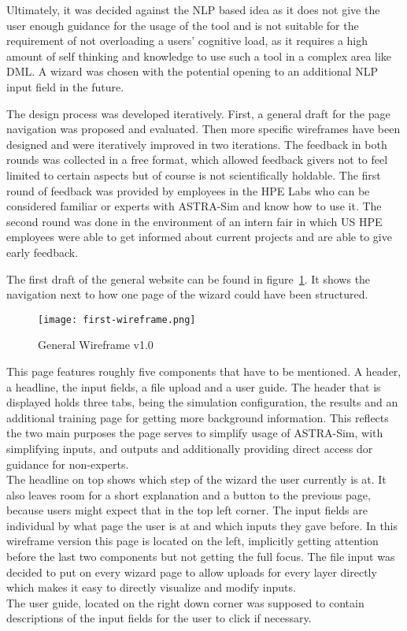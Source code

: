 Ultimately, it was decided against the \ac{NLP} based idea as it does not give the user enough guidance for the usage of the tool and is not suitable for the requirement of not overloading a users' cognitive load, as it requires a high amount of self thinking and knowledge to use such a tool in a complex area like \ac{DML}. A wizard was chosen with the potential opening to an additional \ac{NLP} input field in the future.

The design process was developed iteratively. First, a general draft for the page navigation was proposed and evaluated. Then more specific wireframes have been designed and were iteratively improved in two iterations.
The feedback in both rounds was collected in a free format, which allowed feedback givers not to feel limited to certain aspects but of course is not scientifically holdable.
The first round of feedback was provided by employees in the \ac{HPE} Labs who can be considered familiar or experts with \ac{ASTRA-Sim} and know how to use it. The second round was done in the environment of an intern fair in which \ac{US} \ac{HPE} employees were able to get informed about current projects and are able to give early feedback. %

The first draft of the general website can be found in figure~\ref{fig:wire-1}. It shows the navigation next to how one page of the wizard could have been structured.

\begin{figure}[h]
    \centering
    \texttt{[image: first-wireframe.png]}
    \caption{General Wireframe v1.0}
    \label{fig:wire-1}
\end{figure}

This page features roughly five components that have to be mentioned. A header, a headline, the input fields, a file upload and a user guide. 
The header that is displayed holds three tabs, being the simulation configuration, the results and an additional training page for getting more background information. This reflects the two main purposes the page serves to simplify usage of \ac{ASTRA-Sim}, with simplifying inputs, and outputs and additionally providing direct access dor guidance for non-experts. \\
The headline on top shows which step of the wizard the user currently is at. It also leaves room for a short explanation and a button to the previous page, because users might expect that in the top left corner.
The input fields are individual by what page the user is at and which inputs they gave before. In this wireframe version this page is located on the left, implicitly getting attention before the last two components but not getting the full focus.
The file input was decided to put on every wizard page to allow uploads for every layer directly which makes it easy to directly visualize and modify inputs. \\
The user guide, located on the right down corner was supposed to contain descriptions of the input fields for the user to click if necessary.


